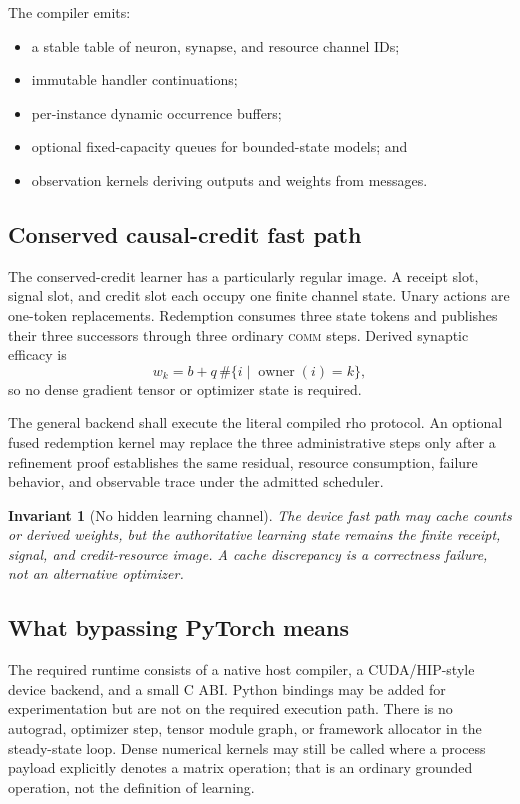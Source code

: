 \documentclass[11pt]{article}
\newtheorem{invariant}[requirement]{Invariant}
\newcommand{\COMM}{\textsc{comm}}
\begin{document}
The compiler emits:
\begin{itemize}
\item a stable table of neuron, synapse, and resource channel IDs;
\item immutable handler continuations;
\item per-instance dynamic occurrence buffers;
\item optional fixed-capacity queues for bounded-state models; and
\item observation kernels deriving outputs and weights from messages.
\end{itemize}

\subsection{Conserved causal-credit fast path}

The conserved-credit learner has a particularly regular image.  A receipt
slot, signal slot, and credit slot each occupy one finite channel state.  Unary
actions are one-token replacements.  Redemption consumes three state tokens
and publishes their three successors through three ordinary \COMM{} steps.
Derived synaptic efficacy is
\[
  w_k=b+q\,\#\{i\mid\operatorname{owner}(i)=k\},
\]
so no dense gradient tensor or optimizer state is required.

The general backend shall execute the literal compiled rho protocol.  An
optional fused redemption kernel may replace the three administrative steps
only after a refinement proof establishes the same residual, resource
consumption, failure behavior, and observable trace under the admitted
scheduler.

\begin{invariant}[No hidden learning channel]
The device fast path may cache counts or derived weights, but the authoritative
learning state remains the finite receipt, signal, and credit-resource image.
A cache discrepancy is a correctness failure, not an alternative optimizer.
\end{invariant}

\subsection{What bypassing PyTorch means}

The required runtime consists of a native host compiler, a CUDA/HIP-style
device backend, and a small C ABI.  Python bindings may be added for
experimentation but are not on the required execution path.  There is no
autograd, optimizer step, tensor module graph, or framework allocator in the
steady-state loop.  Dense numerical kernels may still be called where a
process payload explicitly denotes a matrix operation; that is an ordinary
grounded operation, not the definition of learning.
\end{document}
